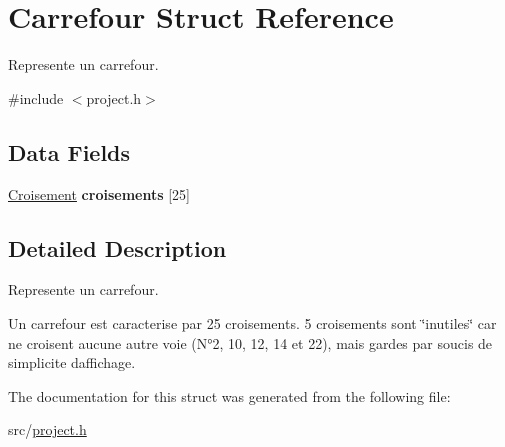 \hypertarget{struct_carrefour}{}\section{Carrefour Struct Reference}
\label{struct_carrefour}


Represente un carrefour.  




{\ttfamily \#include $<$project.\+h$>$}

\subsection*{Data Fields}
\begin{DoxyCompactItemize}
\item 
\hypertarget{struct_carrefour_a5d7ea25dcaf01a3bf1fd06656e609062}{}\hyperlink{struct_croisement}{Croisement} {\bfseries croisements} \mbox{[}25\mbox{]}\label{struct_carrefour_a5d7ea25dcaf01a3bf1fd06656e609062}

\end{DoxyCompactItemize}


\subsection{Detailed Description}
Represente un carrefour. 

Un carrefour est caracterise par 25 croisements. 5 croisements sont \char`\"{}inutiles\char`\"{} car ne croisent aucune autre voie (N°2, 10, 12, 14 et 22), mais gardes par soucis de simplicite d\textquotesingle{}affichage. 

The documentation for this struct was generated from the following file\+:\begin{DoxyCompactItemize}
\item 
src/\hyperlink{project_8h}{project.\+h}\end{DoxyCompactItemize}
